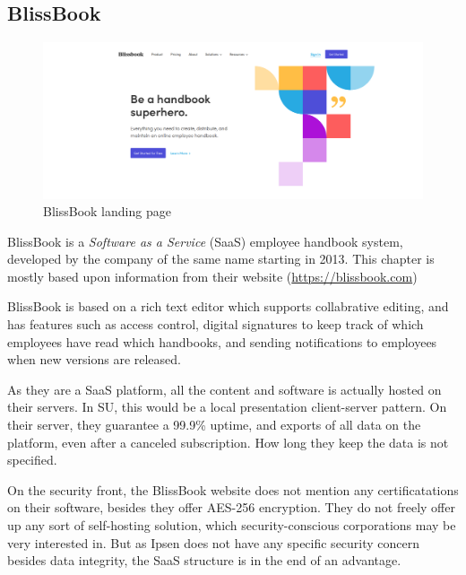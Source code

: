 \subsection{BlissBook}
\begin{figure}[h]
	\includegraphics[width=1\textwidth]{billeder/BlissBooks.png}
	\caption{BlissBook landing page}
\end{figure}
BlissBook is a \textit{Software as a Service} (SaaS) employee handbook system, developed by the company of the same name starting in 2013. %
This chapter is mostly based upon information from their website (\url{https://blissbook.com})

BlissBook is based on a rich text editor which supports collabrative editing, and has features such as access control, digital signatures to keep track of which employees have read which handbooks, and sending notifications to employees when new versions are released.

As they are a SaaS platform, all the content and software is actually hosted on their servers.
In SU, this would be a local presentation client-server pattern. %
On their server, they guarantee a 99.9\% uptime, and exports of all data on the platform, even after a canceled subscription.
How long they keep the data is not specified.

On the security front, the BlissBook website does not mention any certificatations on their software, besides they offer AES-256 encryption. %
They do not freely offer up any sort of self-hosting solution, which security-conscious corporations may be very interested in.
But as Ipsen does not have any specific security concern besides data integrity, the SaaS structure is in the end of an advantage.

